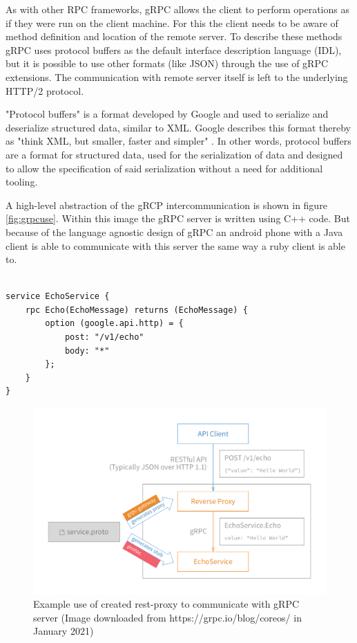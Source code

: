 \documentclass[conference]{IEEEtran}
\begin{document}
As with other RPC frameworks, gRPC allows the client to perform operations as if they were run on the client machine. For this the client needs to be aware of method definition and location of the remote server. To describe these methods gRPC uses protocol buffers \cite{protoBuffer} as the default interface description language (IDL), but it is possible to use other formats (like JSON) through the use of gRPC extensions. The communication with remote server itself is left to the underlying HTTP/2 protocol. 

"Protocol buffers" is a format developed by Google and used to serialize and deserialize structured data, similar to XML. Google describes this format thereby as "think XML, but smaller, faster and simpler" \cite{protoBuffer}. In other words, protocol buffers are a format for structured data, used for the serialization of data and designed to allow the specification of said serialization without a need for additional tooling.

A high-level abstraction of the gRCP intercommunication is shown in figure \ref{fig:grpcuse}. Within this image the gRPC server is written using C++ code. But because of the language agnostic design of gRPC an android phone with a Java client is able to communicate with this server the same way a ruby client is able to.

\begin{lstlisting}[name={Small sample proto buffer specification (Full example available at https://grpc.io/blog/coreos/)},label={code:grpcproto}]  % Start your code-block

service EchoService {
	rpc Echo(EchoMessage) returns (EchoMessage) {
		option (google.api.http) = {
			post: "/v1/echo"
			body: "*"
		};
	}
}
\end{lstlisting}

\begin{figure}
	\centering
	\includegraphics[width=0.8\linewidth]{grpc-rest-gateway.png}
	\caption{Example use of created rest-proxy to communicate with gRPC server (Image downloaded from https://grpc.io/blog/coreos/ in January 2021)}
	\label{fig:restProxy}
\end{figure}
\end{document}
